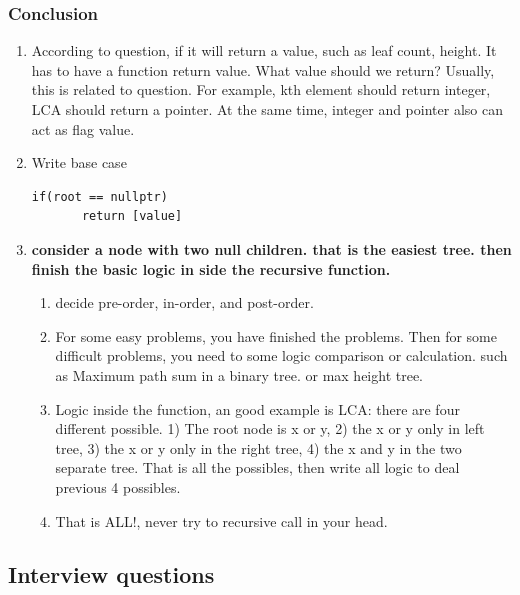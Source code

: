 \documentclass[a4paper,11pt,twoside]{book}
\begin{document}
\subsubsection{Conclusion}
\begin{enumerate}
	\item According to question, if it will return a value, such as leaf count, height. It has to have a function return value. What value should we return? Usually, this is related to question. For example, kth element should return integer, LCA should return a pointer. At the same time, integer and pointer also can act as flag value. 

 
	\item Write base case 
\begin{lstlisting}[breaklines]
if(root == nullptr) 
       return [value] 
\end{lstlisting}

	\item \textbf{consider a node with two null children. that is the easiest tree. then finish the basic logic in side the recursive function.}
\begin{enumerate}
	\item decide pre-order, in-order, and post-order. 

	\item For some easy problems, you have finished the problems. Then for some difficult problems, you need to some logic comparison or calculation. such as Maximum path sum in a binary tree. or max height tree.
	
	\item Logic inside the function, an good example is LCA: there are four different possible. 1) The root node is x or y, 2) the x or y only in left tree, 3) the x or y only in the right tree, 4) the x and y in the two separate tree. That is all the possibles, then write all logic to deal previous 4 possibles. 
	
	\item That is ALL!, never try to recursive call in your head. 
\end{enumerate}

\end{enumerate}

\subsection{Interview questions}
\end{document}
